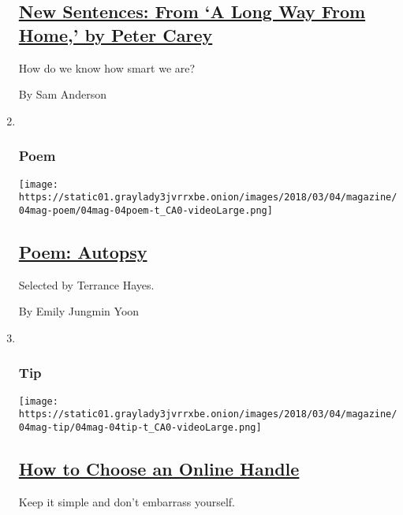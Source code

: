 \begin{enumerate}
  \hypertarget{new-sentences-from-a-long-way-from-home-by-peter-carey}{%
  \subsection{\texorpdfstring{\href{/2018/03/01/magazine/new-sentences-from-a-long-way-from-home-by-peter-carey.html}{New
  Sentences: From `A Long Way From Home,' by Peter
  Carey}}{New Sentences: From `A Long Way From Home,' by Peter Carey}}\label{new-sentences-from-a-long-way-from-home-by-peter-carey}}

  How do we know how smart we are?

  By Sam Anderson
\item ~
  \hypertarget{poem}{%
  \subsubsection{Poem}\label{poem}}

  \texttt{[image: https://static01.graylady3jvrrxbe.onion/images/2018/03/04/magazine/04mag-poem/04mag-04poem-t\_CA0-videoLarge.png]}

  \hypertarget{poem-autopsy}{%
  \subsection{\texorpdfstring{\href{/2018/03/01/magazine/poem-autopsy.html}{Poem:
  Autopsy}}{Poem: Autopsy}}\label{poem-autopsy}}

  Selected by Terrance Hayes.

  By Emily Jungmin Yoon
\item ~
  \hypertarget{tip}{%
  \subsubsection{Tip}\label{tip}}

  \texttt{[image: https://static01.graylady3jvrrxbe.onion/images/2018/03/04/magazine/04mag-tip/04mag-04tip-t\_CA0-videoLarge.png]}

  \hypertarget{how-to-choose-an-online-handle}{%
  \subsection{\texorpdfstring{\href{/2018/03/01/magazine/how-to-choose-an-online-handle.html}{How
  to Choose an Online
  Handle}}{How to Choose an Online Handle}}\label{how-to-choose-an-online-handle}}

  Keep it simple and don't embarrass yourself.


\end{enumerate}

